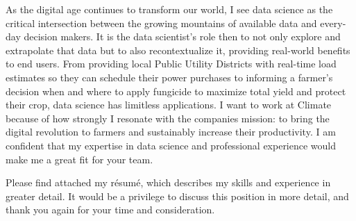 \documentclass[14pt, a4paper]{awesome-cv}
\begin{document}
\begin{cvletter}
As the digital age continues to transform our world, I see data science as the critical intersection between the growing mountains of available data and every-day decision makers. It is the data scientist's role then to not only explore and extrapolate that data but to also recontextualize it, providing real-world benefits to end users. From providing local Public Utility Districts with real-time load estimates so they can schedule their power purchases to informing a farmer's decision when and where to apply fungicide to maximize total yield and protect their crop, data science has limitless applications. I want to work at Climate because of how strongly I resonate with the companies mission: to bring the digital revolution to farmers and sustainably increase their productivity. I am confident that my expertise in data science and professional experience would make me a great fit for your team.

Please find attached my résumé, which describes my skills and experience in greater detail. It would be a privilege to discuss this position in more detail, and thank you again for your time and consideration.

\end{cvletter}

\makeletterclosing
\end{document}
